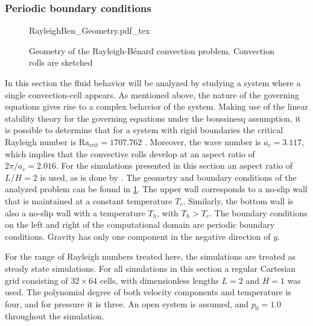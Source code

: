 \subsubsection{Periodic boundary conditions}\label{ssec:SingleCellConv}
\begin{figure}[bt]
	\begin{center}
		\def\svgwidth{0.83\textwidth}
		{RayleighBen_Geometry.pdf_tex}
		\caption{Geometry of the Rayleigh-Bénard convection problem. Convection rolls are sketched}
		\label{fig:RayBenGeometryPeriodic}
	\end{center}
\end{figure}
In this section the fluid behavior will be analyzed by studying a system where a single convection-cell appears. As mentioned above, the nature of the governing equations gives rise to a complex behavior of the system. Making use of the linear stability theory for the governing equations under the boussinesq assumption, it is possible to determine that for a system with rigid boundaries the critical Rayleigh number is $\text{Ra}_{\text{crit}} = 1707.762$ \citep{chandrasekharHydrodynamicHydromagneticStability1961}.  Moreover, the wave number is $a_c =3.117$, which implies that the convective rolls develop at an aspect ratio of $2 \pi/a_c = 2.016$. For the simulations presented in this section an aspect ratio of $L/H = 2$ is used, as is done by \cite{kaoSimulatingOscillatoryFlows2007}. The geometry and boundary conditions of the analyzed problem can be found in \cref{fig:RayBenGeometryPeriodic}. The upper wall corresponds to a no-slip wall that is maintained at a constant temperature $T_c$. Similarly, the bottom wall is also a no-slip wall with a temperature $T_h$, with $T_h > T_c$. The boundary conditions on the left and right of the computational domain are periodic boundary conditions. Gravity has only one component in the negative direction of $y$. %

For the range of Rayleigh numbers treated here, the simulations are treated as steady state simulations. For all simulations in this section a regular Cartesian grid consisting of $32\times64$ cells, with dimensionless lengths $L = 2$ and $H = 1$ was used. The polynomial degree of both velocity components and temperature is four, and for pressure it is three. An open system is assumed, and $p_0 = 1.0$ throughout the simulation.


